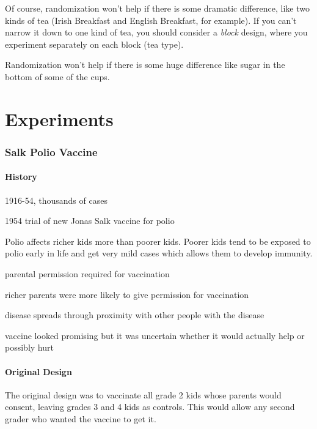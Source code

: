 \documentclass[landscape]{exam}
\begin{document}
  Of course, randomization won't help if there is some dramatic difference, like
  two kinds of tea (Irish Breakfast and English Breakfast, for example).  If you
  can't narrow it down to one kind of tea, you should consider a {\em block}
  design, where you experiment separately on each block (tea type).

  Randomization won't help if there is some huge difference like sugar in the
  bottom of some of the cups.

  \part{Experiments}

  \section{Salk Polio Vaccine}
  \subsection{History}
  \begin{itemize*}
    \item 1916-54, thousands of cases
    \item 1954 trial of new Jonas Salk vaccine for polio
    \item Polio affects richer kids more than poorer kids. Poorer kids tend to
      be exposed to polio early in life and get very mild cases which allows
      them to develop immunity.
    \item parental permission required for vaccination
    \item richer parents were more likely to give permission for vaccination
    \item disease spreads through proximity with other people with the disease
    \item vaccine looked promising but it was uncertain whether it would
      actually help or possibly hurt
  \end{itemize*}

  \subsection{Original Design}
  The original design was to vaccinate all grade 2 kids whose parents would
  consent, leaving grades 3 and 4 kids as controls.  This would allow any second
  grader who wanted the vaccine to get it.
\end{document}
